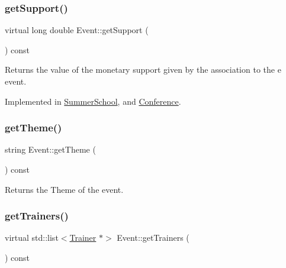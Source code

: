 \mbox{\label{classEvent_a9170bfcbd9b00015dafc5d5cc69a2cfe}} 
\subsubsection{\texorpdfstring{get\+Support()}{getSupport()}}
{\footnotesize\ttfamily virtual long double Event\+::get\+Support (\begin{DoxyParamCaption}{ }\end{DoxyParamCaption}) const\hspace{0.3cm}{\ttfamily [pure virtual]}}



Returns the value of the monetary support given by the association to the e event. 



Implemented in \mbox{\hyperlink{classSummerSchool_a86f34a2f39dcd33171e77c386165219c}{Summer\+School}}, and \mbox{\hyperlink{classConference_a6ca3f0f7b2714881dbc108ea7f08646f}{Conference}}.

\mbox{\label{classEvent_ad83e88dd2fe78a6840dd2c71d217b490}} 
\subsubsection{\texorpdfstring{get\+Theme()}{getTheme()}}
{\footnotesize\ttfamily string Event\+::get\+Theme (\begin{DoxyParamCaption}{ }\end{DoxyParamCaption}) const}



Returns the Theme of the event. 

\mbox{\label{classEvent_a11aad3e5a7ee85bc61b6811d050c5d70}} 
\subsubsection{\texorpdfstring{get\+Trainers()}{getTrainers()}}
{\footnotesize\ttfamily virtual std\+::list$<$\mbox{\hyperlink{classTrainer}{Trainer}} $\ast$$>$ Event\+::get\+Trainers (\begin{DoxyParamCaption}{ }\end{DoxyParamCaption}) const\hspace{0.3cm}{\ttfamily [pure virtual]}}



